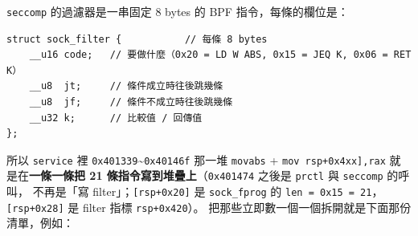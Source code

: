 \documentclass[10pt,a4paper]{article}
\begin{document}
\texttt{seccomp} 的過濾器是一串固定 8 bytes 的 BPF 指令，每條的欄位是：

\begin{Verbatim}[breaklines=true,breakanywhere=true,breakautoindent=false,fontsize=\fontsize{7.0}{9.5}\selectfont]
struct sock_filter {           // 每條 8 bytes
    __u16 code;   // 要做什麼（0x20 = LD W ABS, 0x15 = JEQ K, 0x06 = RET K）
    __u8  jt;     // 條件成立時往後跳幾條
    __u8  jf;     // 條件不成立時往後跳幾條
    __u32 k;      // 比較值 / 回傳值
};
\end{Verbatim}

所以 \texttt{service} 裡
\texttt{0x401339}\textasciitilde{}\texttt{0x40146f} 那一堆
\texttt{movabs} + \texttt{mov\ \allowbreak{}{[}rsp+0x4xx{]},\allowbreak{}rax}
就是在\textbf{一條一條把 21 條指令寫到堆疊上}（\texttt{0x401474} 之後是
\texttt{prctl} 與 \texttt{seccomp} 的呼叫， 不再是「寫
filter」；\texttt{{[}rsp+0x20{]}} 是 \texttt{sock\_\allowbreak{}fprog} 的
\texttt{len\ \allowbreak{}=\ \allowbreak{}0x15\ \allowbreak{}=\ \allowbreak{}21}，\texttt{{[}rsp+0x28{]}} 是 filter 指標
\texttt{rsp+0x420}）。 把那些立即數一個一個拆開就是下面那份清單，例如：
\end{document}
